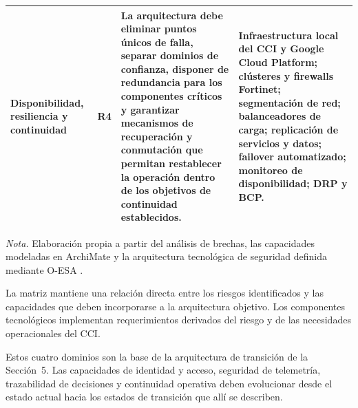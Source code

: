 \begin{table}[H]
\begin{tabularx}{\textwidth}{
			>{\raggedright\arraybackslash}p{2.35cm}
			>{\raggedright\arraybackslash}p{1.15cm}
			>{\raggedright\arraybackslash}X
			>{\raggedright\arraybackslash}X}
		\addlinespace
		
		Disponibilidad, resiliencia y continuidad &
		R4 &
		La arquitectura debe eliminar puntos únicos de falla, separar dominios de confianza, disponer
		de redundancia para los componentes críticos y garantizar mecanismos de recuperación y
		conmutación que permitan restablecer la operación dentro de los objetivos de continuidad
		establecidos. &
		Infraestructura local del CCI y Google Cloud Platform; clústeres y firewalls Fortinet;
		segmentación de red; balanceadores de carga; replicación de servicios y datos; failover
		automatizado; monitoreo de disponibilidad; DRP y BCP. \\
		
		\bottomrule
	\end{tabularx}
	
	\begin{minipage}{0.96\textwidth}
		\footnotesize
		\textit{Nota.} Elaboración propia a partir del análisis de brechas, las capacidades modeladas
		en ArchiMate \parencite{archimate2022,modeloArchimateCCI2026} y la arquitectura tecnológica de seguridad definida mediante O-ESA \parencite{oesa2011,oesaCCI2026}.
	\end{minipage}
\end{table}

La matriz mantiene una relación directa entre los riesgos identificados y las capacidades
que deben incorporarse a la arquitectura objetivo. Los componentes tecnológicos implementan
requerimientos derivados del riesgo y de las necesidades operacionales del CCI.

Estos cuatro dominios son la base de la arquitectura de transición de la Sección~5. Las
capacidades de identidad y acceso, seguridad de telemetría, trazabilidad de decisiones y continuidad
operativa deben evolucionar desde el estado actual hacia los estados de transición que allí se describen.